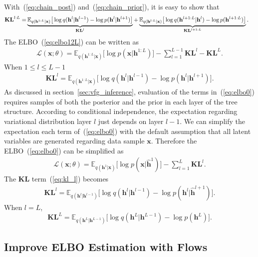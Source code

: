 \documentclass{article}
\begin{document}
With~(\ref{eq:chain_post}) and~(\ref{eq:chain_prior}), it is easy to show that
 \begin{align} \label{eq:kl_lL}
\textbf{\text{KL}}^{l:L} 
=&  \underbrace{\mathbb{E}_{q(\mathbf{h}^{1:L}|\mathbf{x})}\big[  \log q(\mathbf{h}^{l}|\mathbf{h}^{l-1})   - \log p(\mathbf{h}^{l}|\mathbf{h}^{l+1}) \big]}_{\mathbf{KL}^l} + \underbrace{\mathbb{E}_{q(\mathbf{h}^{l:L}|\mathbf{x})}\big[  \log q(\mathbf{h}^{l+1:L}|\mathbf{h}^{l})- \log p(\mathbf{h}^{l+1:L})  \big]}_{\mathbf{KL}^{l+1:L}}.
\end{align}
The ELBO~(\ref{eq:elbo12L}) can be written as 
 \begin{align} \label{eq:elbo0}
\mathcal{L}(\mathbf{x}; \theta) = \mathbb{E}_{q(\mathbf{h}^{1:L}|\mathbf{x})}\big[ \log p(\mathbf{x}|\mathbf{h}^{1:L})  \big] - \sum_{l=1}^{L-1} \mathbf{KL}^l -\mathbf{KL}^L.
\end{align}
When $1\leqslant l \leqslant L-1$
 \begin{align} \label{eq:kl_l}
 \mathbf{KL}^l=\mathbb{E}_{q(\mathbf{h}^{1:L}|\mathbf{x})}\big[  \log q(\mathbf{h}^{l}|\mathbf{h}^{l-1})   - \log p(\mathbf{h}^{l}|\mathbf{h}^{l+1}) \big].
 \end{align}
As discussed in section~\ref{sec:vfg_inference}, evaluation of the terms in~(\ref{eq:elbo0}) requires samples of both the posterior and the prior in each layer of the tree structure. According to conditional independence, the expectation regarding variational distribution layer $l$ just depends on layer $l-1$. We can simplify the expectation each term of~(\ref{eq:elbo0}) with the default assumption that all latent variables are generated regarding data sample $\mathbf{x}$.  Therefore the ELBO~(\ref{eq:elbo0}) can be simplified as 
 \begin{align} \label{eq:elbo1}
\mathcal{L}(\mathbf{x}; \theta) = \mathbb{E}_{q(\mathbf{h}^{1}|\mathbf{x})}\big[ \log p(\mathbf{x}|\widehat{\mathbf{h}}^{1})  \big] - \sum_{l=1}^{L} \mathbf{KL}^l.
\end{align}
The $\mathbf{KL}$ term~(\ref{eq:kl_l}) becomes
\begin{align*}
 \mathbf{KL}^l=\mathbb{E}_{q(\mathbf{h}^{l}|\mathbf{h}^{l-1})}\big[  \log q(\mathbf{h}^{l}|\mathbf{h}^{l-1})   - \log p(\mathbf{h}^{l}|\widehat{\mathbf{h}}^{l+1}) \big].
 \end{align*}
When $l=L$, 
$$\mathbf{KL}^L =  \mathbb{E}_{q(\mathbf{h}^{L}|\mathbf{h}^{L-1})}\big[  \log q(\mathbf{h}^{L}|\mathbf{h}^{L-1})- \log p(\mathbf{h}^{L})  \big].$$

\subsection{Improve ELBO Estimation with Flows}
\end{document}
